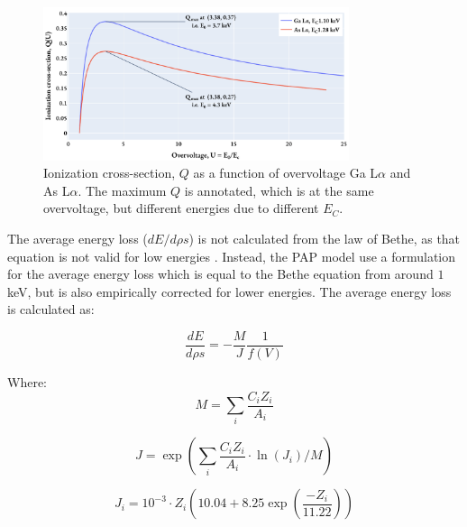 
\begin{figure}[htbp]
    \centering
    \includegraphics[width=0.8\textwidth]{figures/PAP_ionization_cross_section.pdf}
    \caption{
        Ionization cross-section, $Q$ as a function of overvoltage Ga L$\alpha$ and As L$\alpha$.
        The maximum $Q$ is annotated, which is at the same overvoltage, but different energies due to different $E_C$.
    }
    \label{fig:PAP:ionization_cross_section}
\end{figure}



The average energy loss ($dE/d\rho s$) is not calculated from the law of Bethe, as that equation is not valid for low energies \cite{inokuti_on_bethe_1971,pap_1991}.
Instead, the PAP model use a formulation for the average energy loss which is equal to the Bethe equation from around $1$ keV, but is also empirically corrected for lower energies.
The average energy loss is calculated as:


\begin{equation}
    \label{eq:theory:quantitative:pap:calculation_of_F:dE_d_rho_s}
    \frac{dE}{d\rho s} = - \frac{M}{J} \frac{1}{f(V)}
\end{equation}

Where:
\begin{equation}
    \label{eq:theory:quantitative:pap:calculation_of_F:dE_d_rho_s:M}
    M = \sum \limits_{i} \frac{C_i Z_i}{A_i}
\end{equation}

\begin{equation}
    \label{eq:theory:quantitative:pap:calculation_of_F:dE_d_rho_s:J}
    J = \exp(\sum \limits_{i} \frac{C_i Z_i}{A_i} \cdot \ln(J_i)/M)
\end{equation}

\begin{equation}
    \label{eq:theory:quantitative:pap:calculation_of_F:dE_d_rho_s:Ji}
    J_i = 10^{-3} \cdot Z_i (10.04 + 8.25 \exp(\frac{-Z_i}{11.22}))
\end{equation}

